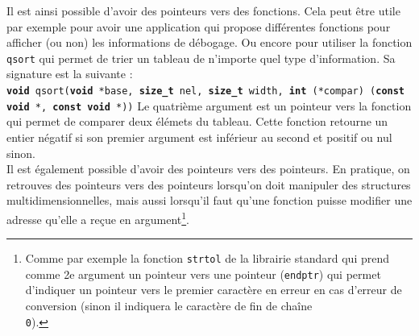 Il est ainsi possible d'avoir des pointeurs vers des fonctions.
Cela peut être utile par exemple pour avoir une application qui propose différentes fonctions pour afficher (ou non) les informations de débogage.
Ou encore pour utiliser la fonction \texttt{qsort} qui permet de trier un tableau de n'importe quel type d'information.
Sa signature est la suivante : \\
\texttt{\textbf{void} qsort(\textbf{void} *base, \textbf{size\_t} nel, \textbf{size\_t} width, \textbf{int} (*compar) (\textbf{const void} *, \textbf{const void} *))}
Le quatrième argument est un pointeur vers la fonction qui permet de comparer deux élémets du tableau.
Cette fonction retourne un entier négatif si son premier argument est inférieur au second et positif ou nul sinon. \\

Il est également possible d'avoir des pointeurs vers des pointeurs.
En pratique, on retrouves des pointeurs vers des pointeurs lorsqu'on doit manipuler des structures multidimensionnelles, mais aussi lorsqu'il faut qu'une fonction puisse modifier une adresse qu'elle a reçue en argument\footnote{Comme par exemple la fonction \texttt{strtol} de la librairie standard qui prend comme 2e argument un pointeur vers une pointeur (\texttt{endptr}) qui permet d'indiquer un pointeur vers le premier caractère en erreur en cas d'erreur de conversion (sinon il indiquera le caractère de fin de chaîne \texttt{\\0}).}.

